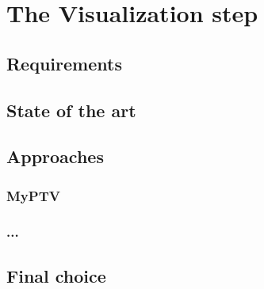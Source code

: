 \chapter{The Visualization step}
\label{chap:visual}

\section{Requirements}

\section{State of the art}

\section{Approaches}

\subsection{MyPTV}

\subsection{...}

\section{Final choice}
